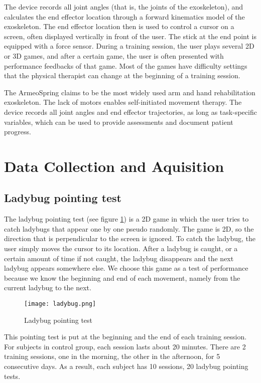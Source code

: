 The device records all joint angles (that is, the joints of the exoskeleton), and calculates the end effector location through a forward kinematics model of the exoskeleton. The end effector location then is used to control a cursor on a screen, often displayed vertically in front of the user. The stick at the end point is equipped with a force sensor. During a training session, the user plays several 2D or 3D games, and after a certain game, the user is often presented with performance feedbacks of that game. Most of the games have difficulty settings that the physical therapist can change at the beginning of a training session.

The ArmeoSpring claims to be the most widely used arm and hand rehabilitation exoskeleton. The lack of motors enables self-initiated movement therapy. The device records all joint angles and end effector trajectories, as long as task-specific variables, which can be used to provide assessments and document patient progress.

\section{Data Collection and Aquisition}
\label{datacollect}


\subsection{Ladybug pointing test}

The ladybug pointing test (see figure \ref{fig:ladybug}) is a 2D game in which the user tries to catch ladybugs that appear one by one pseudo randomly. The game is 2D, so the direction that is perpendicular to the screen is ignored. To catch the ladybug, the user simply moves the cursor to its location. After a ladybug is caught, or a certain amount of time if not caught, the ladybug disappears and the next ladybug appears somewhere else. We choose this game as a test of performance because we know the beginning and end of each movement, namely from the current ladybug to the next.

\begin{figure}
	\texttt{[image: ladybug.png]}
	\centering
	\caption{Ladybug pointing test}
	\label{fig:ladybug}
\end{figure}

This pointing test is put at the beginning and the end of each training session. For subjects in control group, each session lasts about 20 minutes. There are 2 training sessions, one in the morning, the other in the afternoon, for 5 consecutive days. As a result, each subject has 10 sessions, 20 ladybug pointing tests. 

